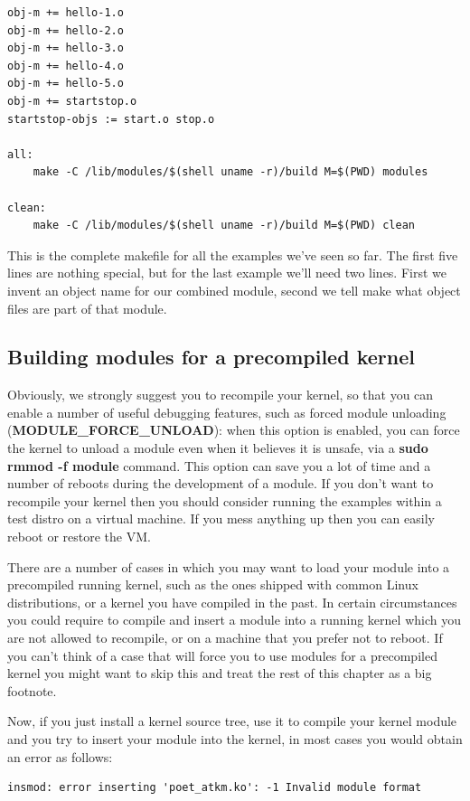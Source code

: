 \documentclass[11pt]{article}
\begin{document}
\begin{verbatim}
obj-m += hello-1.o
obj-m += hello-2.o
obj-m += hello-3.o
obj-m += hello-4.o
obj-m += hello-5.o
obj-m += startstop.o
startstop-objs := start.o stop.o

all:
    make -C /lib/modules/$(shell uname -r)/build M=$(PWD) modules

clean:
    make -C /lib/modules/$(shell uname -r)/build M=$(PWD) clean
\end{verbatim}

This is the complete makefile for all the examples we've seen so far. The first five lines are nothing special, but for the last example we'll need two lines. First we invent an object name for our combined module, second we tell make what object files are part of that module.

\subsection*{Building modules for a precompiled kernel}
\label{sec-4-7}
Obviously, we strongly suggest you to recompile your kernel, so that you can enable a number of useful debugging features, such as forced module unloading (\textbf{MODULE\_FORCE\_UNLOAD}): when this option is enabled, you can force the kernel to unload a module even when it believes it is unsafe, via a \textbf{sudo rmmod -f module} command. This option can save you a lot of time and a number of reboots during the development of a module. If you don't want to recompile your kernel then you should consider running the examples within a test distro on a virtual machine. If you mess anything up then you can easily reboot or restore the VM.

There are a number of cases in which you may want to load your module into a precompiled running kernel, such as the ones shipped with common Linux distributions, or a kernel you have compiled in the past. In certain circumstances you could require to compile and insert a module into a running kernel which you are not allowed to recompile, or on a machine that you prefer not to reboot. If you can't think of a case that will force you to use modules for a precompiled kernel you might want to skip this and treat the rest of this chapter as a big footnote.

Now, if you just install a kernel source tree, use it to compile your kernel module and you try to insert your module into the kernel, in most cases you would obtain an error as follows:

\begin{verbatim}
insmod: error inserting 'poet_atkm.ko': -1 Invalid module format
\end{verbatim}
\end{document}
